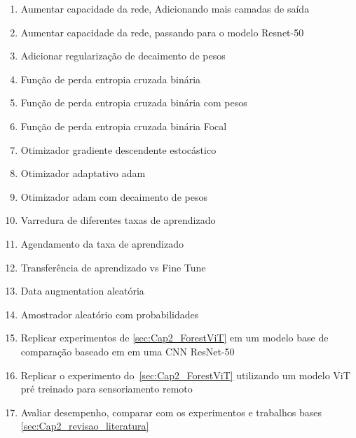 \begin{enumerate}
    \item  Aumentar capacidade da rede, Adicionando mais camadas de saída
    \item  Aumentar capacidade da rede, passando para o modelo Resnet-50
    \item Adicionar regularização de decaimento de pesos
    \item Função de perda entropia cruzada binária
    \item Função de perda entropia cruzada binária com pesos 
    \item Função de perda entropia cruzada binária Focal
    \item Otimizador gradiente descendente estocástico
    \item Otimizador adaptativo adam 
    \item Otimizador adam com decaimento de pesos
    \item Varredura de diferentes taxas de aprendizado
    \item Agendamento da taxa de aprendizado
    \item Transferência de aprendizado vs Fine Tune
    \item Data augmentation aleatória
    \item Amostrador aleatório com probabilidades 
    \item  Replicar experimentos de \ref{sec:Cap2_ForestViT} em um modelo base de comparação baseado em em uma CNN ResNet-50
    \item  Replicar o experimento do~\ref{sec:Cap2_ForestViT} utilizando um modelo ViT pré treinado para sensoriamento remoto
    \item Avaliar desempenho, comparar com os experimentos e trabalhos bases \ref{sec:Cap2_revisao_literatura}
    \end{enumerate}


